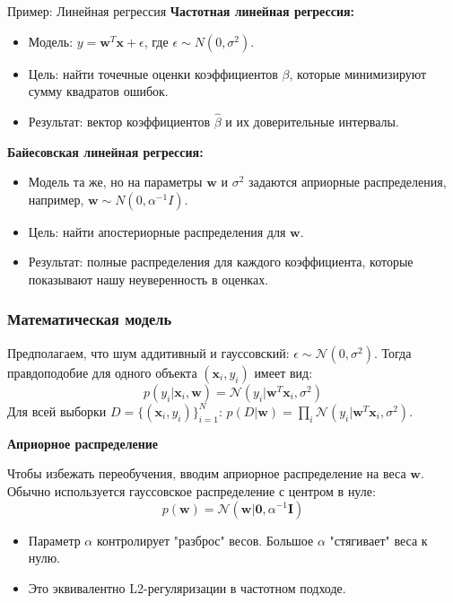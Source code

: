 \documentclass[notheorems, handout]{beamer}
\newcommand{\vect}[1]{\mathbf{#1}}
\newcommand{\matr}[1]{\boldsymbol{#1}}
\begin{document}
\begin{frame}{Пример: Линейная регрессия}
    \textbf{Частотная линейная регрессия:}
    \begin{itemize}
        \item Модель: $y = \vect{w}^T\vect{x} + \epsilon$, где $\epsilon \sim N(0, \sigma^2)$.
        \item Цель: найти точечные оценки коэффициентов $\beta$, которые минимизируют сумму квадратов ошибок.
        \item Результат: вектор коэффициентов $\hat{\beta}$ и их доверительные интервалы.
    \end{itemize}
    \vspace{0.5cm}
    \textbf{Байесовская линейная регрессия:}
    \begin{itemize}
        \item Модель та же, но на параметры $\vect{w}$ и $\sigma^2$ задаются априорные распределения, например, $\vect{w} \sim N(0, \alpha^{-1}I)$.
        \item Цель: найти апостериорные распределения для $\vect{w}$.
        \item Результат: полные распределения для каждого коэффициента, которые показывают нашу неуверенность в оценках.
    \end{itemize}
\end{frame}
\begin{frame}
  \frametitle{Математическая модель}
  Предполагаем, что шум аддитивный и гауссовский: $\epsilon \sim \mathcal{N}(0, \sigma^2)$.
  Тогда правдоподобие для одного объекта $(\vect{x}_i, y_i)$ имеет вид:
  $$ p(y_i|\vect{x}_i, \vect{w}) = \mathcal{N}(y_i | \vect{w}^T\vect{x}_i, \sigma^2) $$
  Для всей выборки $D = \{(\vect{x}_i, y_i)\}_{i=1}^N$: $p(D|\vect{w}) = \prod_i \mathcal{N}(y_i | \vect{w}^T\vect{x}_i, \sigma^2)$.
  
  \vspace{1em}
  \textbf{Априорное распределение}
  
  Чтобы избежать переобучения, вводим априорное распределение на веса $\vect{w}$. Обычно используется гауссовское распределение с центром в нуле:
  $$ p(\vect{w}) = \mathcal{N}(\vect{w} | \vect{0}, \alpha^{-1}\matr{I}) $$
  \begin{itemize}
    \item Параметр $\alpha$ контролирует "разброс" весов. Большое $\alpha$ "стягивает" веса к нулю.
    \item Это эквивалентно L2-регуляризации в частотном подходе.
  \end{itemize}
\end{frame}
\end{document}
